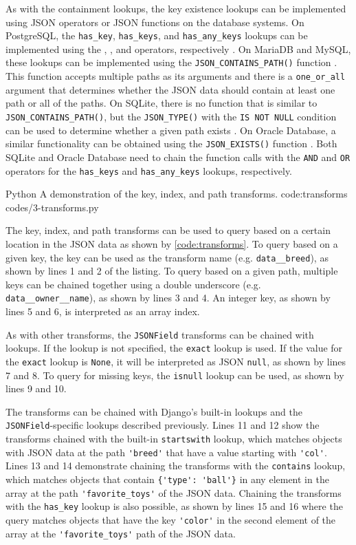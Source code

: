 As with the containment lookups, the key existence lookups can be implemented
using JSON operators or JSON functions on the database systems. On PostgreSQL,
the \verb|has_key|, \verb|has_keys|, and \verb|has_any_keys| lookups can be
implemented using the , , and  operators,
respectively \cite{postgres:json_operators}. On MariaDB and MySQL, these
lookups can be implemented using the \verb|JSON_CONTAINS_PATH()| function
\cite{mariadb:json_contains_path, mysql:json_search}. This function accepts
multiple paths as its arguments and there is a \verb|one_or_all| argument that
determines whether the JSON data should contain at least one path or all of the
paths. On SQLite, there is no function that is similar to
\verb|JSON_CONTAINS_PATH()|, but the \verb|JSON_TYPE()| with the
\verb|IS NOT NULL| condition can be used to determine whether a given path
exists \cite{sqlite:json1}. On Oracle Database, a similar functionality can be
obtained using the \verb|JSON_EXISTS()| function \cite{oracle:json_exists}. Both
SQLite and Oracle Database need to chain the function calls with the \verb|AND|
and \verb|OR| operators for the \verb|has_keys| and \verb|has_any_keys|
lookups, respectively.

\listing
{Python}
{A demonstration of the key, index, and path transforms.}
{code:transforms}
{codes/3-transforms.py}

The key, index, and path transforms can be used to query based on a certain
location in the JSON data as shown by \autoref{code:transforms}. To query based
on a given key, the key can be used as the transform name (e.g.
\verb|data__breed|), as shown by lines 1 and 2 of the listing. To query based
on a given path, multiple keys can be chained together using a double
underscore (e.g. \verb|data__owner__name|), as shown by lines 3 and 4. An
integer key, as shown by lines 5 and 6, is interpreted as an array index.

As with other transforms, the \verb|JSONField| transforms can be chained with
lookups. If the lookup is not specified, the \verb|exact| lookup is used. If
the value for the \verb|exact| lookup is \verb|None|, it will be interpreted as
JSON \verb|null|, as shown by lines 7 and 8. To query for missing keys, the
\verb|isnull| lookup can be used, as shown by lines 9 and 10.

The transforms can be chained with Django's built-in lookups and the
\verb|JSONField|-specific lookups described previously. Lines 11 and 12 show
the transforms chained with the built-in \verb|startswith| lookup, which
matches objects with JSON data at the path \verb|'breed'| that have a value
starting with \verb|'col'|. Lines 13 and 14 demonstrate chaining the transforms
with the \verb|contains| lookup, which matches objects that contain
\verb|{'type': 'ball'}| in any element in the array at the path
\verb|'favorite_toys'| of the JSON data. Chaining the transforms with the
\verb|has_key| lookup is also possible, as shown by lines 15 and 16 where the
query matches objects that have the key \verb|'color'| in the second element of
the array at the \verb|'favorite_toys'| path of the JSON data.

